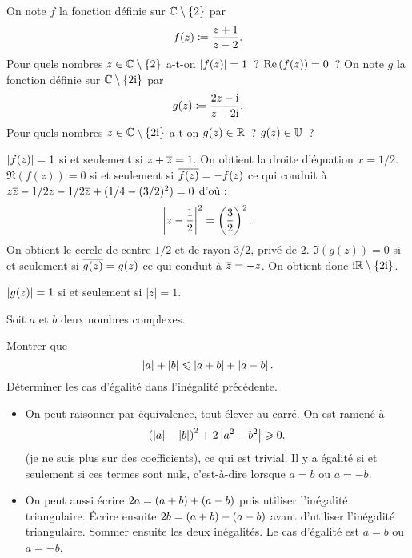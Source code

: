 \documentclass{magnolia}
\begin{document}


\begin{questions}
\question On note $f$ la fonction définie sur $\mathbb{C}\setminus\left\{2\right\}$ par
  \[f(z)\coloneqq\frac{z+1}{z-2}.\]
  Pour quels nombres $z\in\mathbb{C}\setminus\left\{2\right\}$ a-t-on $\left|f(z)\right|=1$~? $\mathop{\rm Re}\left(f(z)\right)=0$~?
\question On note $g$ la fonction définie sur $\mathbb{C}\setminus\left\{2{\rm i}\right\}$ par
  \[g(z)\coloneqq\frac{2z-{\rm i}}{z-2{\rm i}}.\]
  Pour quels nombres $z\in\mathbb{C}\setminus\left\{2{\rm i}\right\}$ a-t-on $g(z)\in\mathbb{R}$~? $g(z)\in\U$~?
\end{questions}
\begin{sol}
\begin{questions}
\question $\left|f(z)\right|=1$ si et seulement si $z+\overline{z}=1$. On obtient la droite d'équation $x=1/2$.\\
$\Re(f(z))=0$ si et seulement si $\overline{f(z)}=-f(z)$ ce qui conduit à $z\overline{z}-1/2z-1/2\overline{z}+(1/4-(3/2)^2)=0$ d'où :
\[\left|z-\frac{1}{2}\right|^2=\left(\frac{3}{2}\right)^2.\]
On obtient le cercle de centre $1/2$ et de rayon $3/2$, privé de $2$.
\question  $\Im(g(z))=0$ si et seulement si $\overline{g(z)}=g(z)$ ce qui conduit à $\overline{z}=-z$. On obtient donc ${\rm i}\mathbb{R}\setminus\left\{2{\rm i}\right\}$.

$\left|g(z)\right|=1$ si et seulement si $|z|=1$.

\end{questions}
\end{sol}


Soit $a$ et $b$ deux nombres complexes.
\begin{questions}
\question Montrer que
\[\left|a\right|+\left|b\right|\leqslant\left|a+b\right|+\left|a-b\right|.\]
\question Déterminer les cas d'égalité dans l'inégalité précédente.
\end{questions}
\begin{sol}
\begin{itemize}
\item On peut raisonner par équivalence, tout élever au carré. On est ramené à
\[\left(\left|a\right|-\left|b\right|\right)^2+2\left|a^2-b^2\right| \geqslant 0.\]
(je ne suis plus sur des coefficients), ce qui est trivial. Il y a égalité si et seulement si ces termes sont nuls, c'est-à-dire lorsque $a=b$ ou $a=-b$.
\item On peut aussi écrire $2a=\left(a+b\right)+\left(a-b\right)$ puis utiliser l'inégalité triangulaire.
Écrire ensuite $2b=\left(a+b\right)-\left(a-b\right)$ avant d'utiliser l'inégalité
triangulaire. Sommer ensuite les deux inégalités. Le cas d'égalité est
$a=b$ ou $a=-b$.
\end{itemize}
\end{sol}
\end{document}
